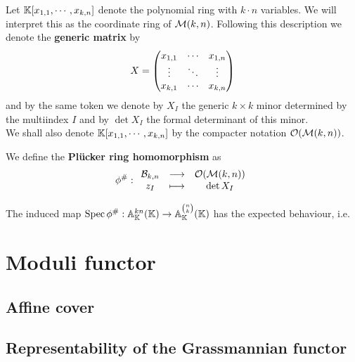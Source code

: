 \begin{notation}
Let $\mathbb{K}[x_{1,1},\cdots,x_{k,n}]$ denote the polynomial ring with $k\cdot n$ variables. We will interpret this as the coordinate ring of $\mathcal{M}(k,n)$. Following this description we denote the \textbf{generic matrix} by
\[X=\begin{pmatrix}
    x_{1,1} & \cdots & x_{1,n}\\
    \vdots & \ddots & \vdots\\
    x_{k,1} &\cdots & x_{k,n}\end{pmatrix}\]
and by the same token we denote by $X_I$ the generic $k\times k$ minor determined by the multiindex $I$ and by $\det X_I$ the formal determinant of this minor.\\
We shall also denote $\mathbb{K}[x_{1,1},\cdots, x_{k,n}]$ by the compacter notation $\mathcal{O}(\mathcal{M}(k,n))$.
\end{notation}

\begin{definition}
We define the \textbf{Pl\"ucker ring homomorphism} as
\[\phi^\#:\begin{array}{ccc} {\mathcal{B}_{k,n}} & \longrightarrow & {\mathcal{O}(\mathcal{M}(k,n))}\\ {z_I} & \longmapsto & {\det X_I} \end{array}\]
\end{definition}

\begin{proposition}\label{PluckerRingHomomorphismWorksForKPoints}
The induced map $\mathrm{Spec}\, \phi^\#:\mathbb{A}^{kn}_{\mathbb{K}}(\mathbb{K})\to \mathbb{A}^{\binom nk}_{\mathbb{K}}(\mathbb{K})$ has the expected behaviour, i.e. 
\end{proposition}



\section{Moduli functor}

\subsection{Affine cover}

\subsection{Representability of the Grassmannian functor}